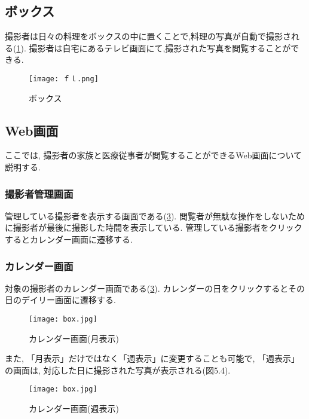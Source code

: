 \documentclass[../report]{subfiles}
\begin{document}
\subsection{ボックス}
撮影者は日々の料理をボックスの中に置くことで,料理の写真が自動で撮影される(\ref{fig:fl}).
撮影者は自宅にあるテレビ画面にて,撮影された写真を閲覧することができる.
\begin{figure}[htbp]
    \begin{center}
        \texttt{[image: ｆｌ.png]}
        \caption{ボックス}
        \label{fig:fl}
    \end{center}
\end{figure}

\subsection{Web画面}
ここでは, 撮影者の家族と医療従事者が閲覧することができるWeb画面について説明する.

\subsubsection{撮影者管理画面}
管理している撮影者を表示する画面である(\ref{fig:box}). 
閲覧者が無駄な操作をしないために撮影者が最後に撮影した時間を表示している. 
管理している撮影者をクリックするとカレンダー画面に遷移する.

\subsubsection{カレンダー画面}
対象の撮影者のカレンダー画面である(\ref{fig:box}).
カレンダーの日をクリックするとその日のデイリー画面に遷移する. 

\begin{figure}[htbp]
    \begin{center}
        \texttt{[image: box.jpg]}
        \caption{カレンダー画面(月表示)}
        \label{fig:box}
    \end{center}
\end{figure}

また, 「月表示」だけではなく「週表示」に変更することも可能で, 「週表示」の画面は, 対応した日に撮影された写真が表示される(図5.4).

\begin{figure}[htbp]
    \begin{center}
        \texttt{[image: box.jpg]}
        \caption{カレンダー画面(週表示)}
        \label{fig:box}
    \end{center}
\end{figure}
\end{document}
